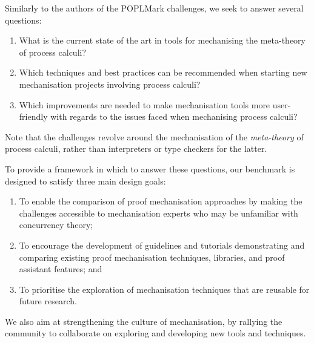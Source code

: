 \documentclass[runningheads]{llncs}
\begin{document}
Similarly to the authors of the POPLMark challenges, we seek to answer several questions:
\begin{enumerate}[label=\textbf{(Q\arabic*)},leftmargin=10mm]
\item\label{item:rq1} What is the current state of the art in tools for mechanising the meta-theory of process calculi?
\item\label{item:rq2} Which techniques and best practices can be recommended when starting new mechanisation projects involving process calculi?
\item\label{item:rq3} Which improvements are needed to make mechanisation tools more user-friendly with regards to the issues faced when mechanising process calculi?
\end{enumerate}
%
Note that the challenges revolve around the mechanisation of the
\emph{meta-theory} of process calculi, rather than interpreters or
type checkers for the latter.

To provide a framework in which to answer these questions, our benchmark is designed to satisfy three main design goals:
\begin{enumerate}[label=\textbf{(G\arabic*)},leftmargin=10mm]
\item\label{item:goal-comperison-accessibility} To enable the comparison of
  proof mechanisation approaches by making the challenges accessible to
  mechanisation experts who may be unfamiliar with concurrency theory;

\item\label{item:goal-tutorials} To encourage the development of guidelines and
  tutorials demonstrating and comparing existing proof mechanisation
  techniques, libraries, and proof assistant features; and

\item\label{item:goal-reusability} To prioritise the exploration of mechanisation
  techniques that are reusable for future research.
\end{enumerate}
We also aim at strengthening the culture of mechanisation, by rallying the community to collaborate on exploring and developing new tools and techniques.
\end{document}
